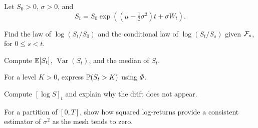 \begin{exercise}
Let \(S_0>0\), \(\sigma>0\), and
\[
S_t=S_0\exp\!\left(
\left(\mu-\tfrac12\sigma^2\right)t+\sigma W_t
\right).
\]
\begin{exparts}
  \item Find the law of \(\log(S_t/S_0)\) and the conditional law of
  \(\log(S_t/S_s)\) given \(\mathcal F_s\), for \(0\leq s<t\).
  \item Compute \(\mathbb E[S_t]\), \(\operatorname{Var}(S_t)\), and the median of
  \(S_t\).
  \item For a level \(K>0\), express \(\mathbb P(S_t>K)\) using \(\Phi\).
  \item Compute \([\log S]_t\) and explain why the drift does not appear.
  \item For a partition of \([0,T]\), show how squared log-returns provide
  a consistent estimator of \(\sigma^2\) as the mesh tends to zero.
\end{exparts}
\end{exercise}
\fi
